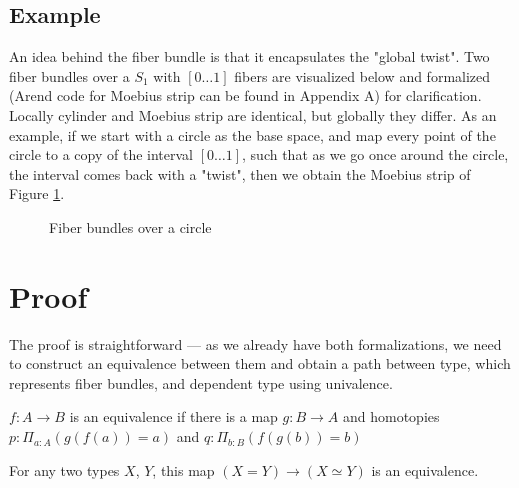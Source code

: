 \subsection{Example}

An idea behind the fiber bundle is that it encapsulates the "global twist". Two fiber bundles over a $S_1$ with $[0 \dots 1]$ fibers are visualized below and formalized (Arend code for Moebius strip can be found in Appendix A) for clarification. Locally cylinder and Moebius strip are identical, but globally they differ. As an example, if we start with a circle as the base space, and map every point of the circle to a copy of the interval $[0 \dots 1]$, such that as we go once around the circle, the interval comes back with a "twist", then we obtain the Moebius strip of Figure \ref{fig:1}.  

\begin{figure}[H]
\centering
{}
\caption{Fiber bundles over a circle} \label{fig:1}
\end{figure}

\section{Proof}

The proof is straightforward --- as we already have both formalizations, we need to construct an equivalence between them and obtain a path between type, which represents fiber bundles, and dependent type using univalence.
\begin{mydefinition}[Equivalences]
	$f : A \to B$ is an equivalence if there is a map $g : B \to A$ and homotopies $p : \Pi_{a : A}(g(f(a)) = a)$ and $q : \Pi_{b : B}(f(g(b)) = b)$
\end{mydefinition}
\begin{mydefinition}[Univalence]
	For any two types $X$, $Y$, this map $(X=Y) \to (X \simeq Y)$ is an equivalence.
\end{mydefinition}

